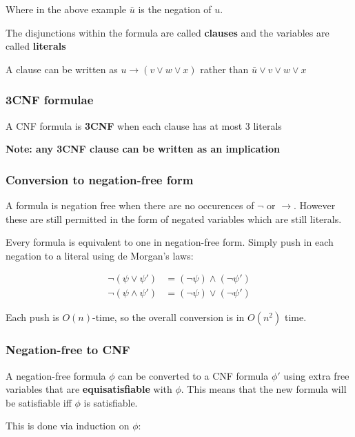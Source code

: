 \documentclass{article}
\begin{document}
Where in the above example $\bar{u}$ is the negation of $u$.

The disjunctions within the formula are called \textbf{clauses } and the variables are called \textbf{literals}

A clause can be written as $u \rightarrow (v \vee w \vee x)$ rather than $\bar{u} \vee v \vee w \vee x$

\subsubsection{3CNF formulae}
\label{subsubsec:3cnf}

A CNF formula is \textbf{3CNF} when each clause has at most 3 literals

\textbf{Note: any 3CNF clause can be written as an implication}

\subsubsection{Conversion to negation-free form}
\label{subsec:negneg}

A formula is negation free when there are no occurences of $\neg$ or $\rightarrow $. However these are still permitted in the form of negated variables which are still literals.

Every formula is equivalent to one in negation-free form. Simply push in each negation to a literal using de Morgan's laws:

\begin{align*}
  \neg(\psi \vee \psi ') &= (\neg \psi) \wedge (\neg \psi ') \\
  \neg(\psi \wedge \psi ') &= (\neg \psi) \vee (\neg \psi ')
\end{align*}

Each push is $O(n)$-time, so the overall conversion is in $O(n^{2})$ time.

\subsubsection{Negation-free to CNF}
\label{subsec:neg-free-CNF}

A negation-free formula $\phi$ can be converted to a CNF formula $\phi '$ using extra free variables that are \textbf{equisatisfiable} with $\phi$. This means that the new formula will be satisfiable iff $\phi$ is satisfiable.

This is done via induction on $\phi$:
\end{document}
